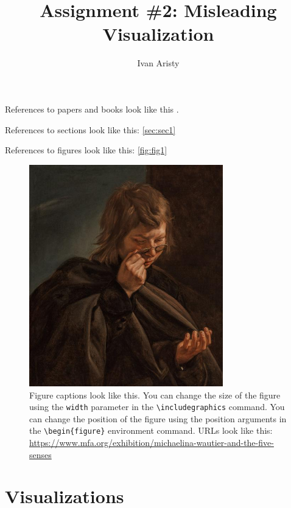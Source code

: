 \documentclass{article}
\title{Assignment \#2: Misleading Visualization}
\author{Ivan Aristy}
\begin{document}
  \maketitle %
  \thispagestyle{empty}

References to papers and books look like this \cite{munzner2014visualization}. 

References to sections look like this: \autoref{sec:sec1}

References to figures look like this: \autoref{fig:fig1}

\begin{figure}[ht] %
    \centering
    \includegraphics[width=0.75\textwidth]{figs/sight.jpg}
    \caption{
        Figure captions look like this. You can change the size of the figure using the \texttt{width} parameter in the \texttt{\textbackslash includegraphics} command. You can change the position of the figure using the position arguments in the \texttt{\textbackslash begin\{figure\}} environment command.
        URLs look like this: \url{https://www.mfa.org/exhibition/michaelina-wautier-and-the-five-senses}
    }
    \label{fig:fig1}
\end{figure}

\section{Visualizations}
\label{sec:sec1}
\end{document}
